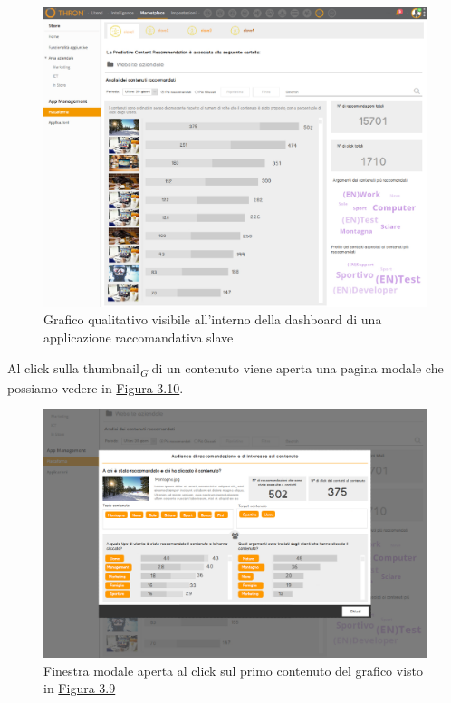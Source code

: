 \documentclass[a4paper, 12pt, twoside, openright]{book}
\newcommand{\gloss}[1]{#1\textsubscript{\textit{\tiny{G}}}}
\begin{document}
\begin{figure}[H]
	\centering
	\label{grafico-qualitativo-1}
	\includegraphics[width=1.0\textwidth]{images/grafico-qualitativo-1.jpg}
	\caption{Grafico qualitativo visibile all'interno della dashboard di una applicazione raccomandativa slave}
\end{figure}
Al click sulla \gloss{thumbnail} di un contenuto viene aperta una pagina modale che possiamo vedere in \hyperref[grafico-qualitativo-2]{Figura 3.10}. 
\begin{figure}[H]
	\centering
	\label{grafico-qualitativo-2}
	\includegraphics[width=1.0\textwidth]{images/grafico-qualitativo-2.jpg}
	\caption{Finestra modale aperta al click sul primo contenuto del grafico visto in \hyperref[grafico-qualitativo-1]{Figura 3.9}}
\end{figure}
\end{document}
